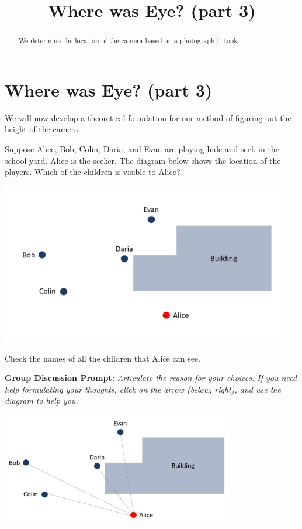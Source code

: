\documentclass{ximera}
\title{Where was Eye? (part 3)} \license{CC BY-NC-SA 4.0}
\begin{document}
\begin{abstract}
We determine the location of the camera based on a photograph it took.
\end{abstract}
\maketitle

\section*{Where was Eye? (part 3)}


We will now develop a theoretical foundation for our method of figuring out the height of the camera. 

\begin{exploration}\label{exp:hideAndSeek}
Suppose Alice, Bob, Colin, Daria, and Evan are playing hide-and-seek in the school yard.  Alice is the seeker.  The diagram below shows the location of the players.  Which of the children is visible to Alice?
     \begin{image}
         \includegraphics[width=5in]{hideAndSeek1.jpg}
\end{image}
Check the names of all the children that Alice can see.
\begin{selectAll}
\end{selectAll}

\textbf{Group Discussion Prompt:}
\emph{Articulate the reason for your choices.  If you need help formulating your thoughts, click on the arrow (below, right), and use the diagram to help you.}

\begin{expandable}
    \begin{image}
         \includegraphics[width=4in]{hideAndSeek2.jpg}
\end{image}
\end{expandable}
\end{exploration}
\end{document}
